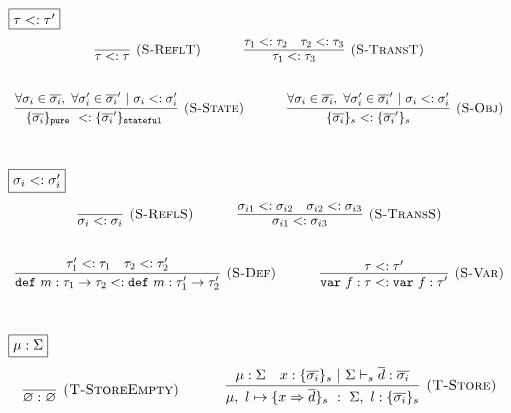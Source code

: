 \documentclass{llncs}
\newcommand{\keywadj}[1]{\mathtt{#1}}
\newcommand{\keyw}[1]{\keywadj{#1}~}
\begin{document}
$\fbox{$\tau <: \tau'$}$
\[
\begin{array}{c}
\infer[\textsc{(S-ReflT)}]
  {\tau <: \tau}
  {}%
~~~~~~~~~~
\infer[\textsc{(S-TransT)}]
  {\tau_1 <: \tau_3}
  {\tau_1 <: \tau_2 & \tau_2 <: \tau_3}\\[5ex]

\infer[\textsc{(S-State)}]
  {\{ \overline{\sigma_i} \}_{\keyw{pure}} <: \{ \overline{\sigma_i}' \}_{\keyw{stateful}}}
  {\forall \sigma_i \in \overline{\sigma_i},~\forall \sigma_i' \in \overline{\sigma_i}'~|~\sigma_i <: \sigma_i'}%
~~~~~~~~~~
\infer[\textsc{(S-Obj)}]
  {\{ \overline{\sigma_i} \}_{s} <: \{ \overline{\sigma_i}' \}_{s}}
  {\forall \sigma_i \in \overline{\sigma_i},~\forall \sigma_i' \in \overline{\sigma_i}'~|~\sigma_i <: \sigma_i'}\\[5ex]  

\end{array}
\]

$\fbox{$\sigma_i <: \sigma_i'$}$
\[
\begin{array}{c}
\infer[\textsc{(S-ReflS)}]
  {\sigma_i <: \sigma_i}
  {}%
~~~~~~~~~~
\infer[\textsc{(S-TransS)}]
  {\sigma_{i1} <: \sigma_{i3}}
  {\sigma_{i1} <: \sigma_{i2} & \sigma_{i2} <: \sigma_{i3}}\\[5ex]

\infer[\textsc{(S-Def)}]
  {\keyw{def} m:\tau_1 \rightarrow \tau_2 <: \keyw{def} m:\tau_1' \rightarrow \tau_2'}
  {\tau_1' <: \tau_1 & \tau_2 <: \tau_2'}%
~~~~~~~~~~
\infer[\textsc{(S-Var)}]
  {\keyw{var} f:\tau <: \keyw{var} f:\tau'}
  {\tau <: \tau'}\\[5ex]  

\end{array}
\]

$\fbox{$\mu : \Sigma$}$
\[
\begin{array}{c}

\infer[\textsc{(T-StoreEmpty)}]
  {\varnothing : \varnothing}
  {}%
~~~~~~~~~~
\infer[\textsc{(T-Store)}]
  {\mu,~l \mapsto \{ x \Rightarrow \overline{d} \}_s~:~\Sigma,~l : \{ \overline{\sigma_i} \}_s}
  {\mu : \Sigma & x : \{ \overline{\sigma_i} \}_s~|~\Sigma \vdash_s \overline{d} : \overline{\sigma_i}}\\[5ex]

\end{array}
\]
\end{document}
